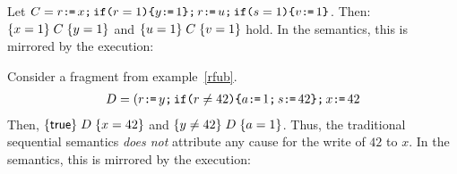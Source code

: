 Let $\aCmd = r \GETS x \SEMI \IF{r=1} \THEN y \GETS 1 \FI \SEMI r \GETS u \SEMI \IF{s=1} \THEN v \GETS 1 \FI$.  Then:
$ \hoare{x=1}{\aCmd}{y=1}$ and
$ \hoare{u=1}{\aCmd}{v=1}$
hold.  In the semantics, this is mirrored by the execution:
\begin{tikzdisplay}[node distance=1em]
\end{tikzdisplay}


Consider a fragment from example~\eqref{rfub}.
\begin{align*}
\bCmd = (r \GETS y \SEMI \IF{r \NOTEQ 42} \THEN a \GETS 1 \SEMI s \GETS 42 \FI \SEMI x \GETS 42
\end{align*}
Then, $\hoare{\TRUE}{\bCmd}{x=42} $ and $\hoare{y \neq 42}{\bCmd}{a= 1} $.  Thus, the traditional sequential semantics {\em does not} attribute any cause for the write of $42$ to $x$.  
In the semantics, this is mirrored by the execution:
\begin{tikzdisplay}[node distance=1em]
\end{tikzdisplay}


\endinput 



